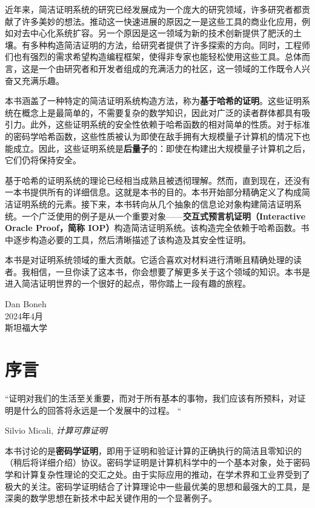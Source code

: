 \documentclass[american,singlepageview]{snargs-book-zh}
\begin{document}
近年来，简洁证明系统的研究已经发展成为一个庞大的研究领域，许多研究者都贡献了许多美妙的想法。推动这一快速进展的原因之一是这些工具的商业化应用，例如对去中心化系统扩容。另一个原因是这一领域为新的技术创新提供了肥沃的土壤。有多种构造简洁证明的方法，给研究者提供了许多探索的方向。同时，工程师们也有强烈的需求希望构造编程框架，使得非专家也能轻松使用这些工具。总体而言，这是一个由研究者和开发者组成的充满活力的社区，这一领域的工作既令人兴奋又充满乐趣。

本书涵盖了一种特定的简洁证明系统构造方法，称为\textbf{基于哈希的证明}。这些证明系统在概念上是最简单的，不需要复杂的数学知识，因此对广泛的读者群体都具有吸引力。此外，这些证明系统的安全性依赖于哈希函数的相对简单的性质。对于标准的密码学哈希函数，这些性质被认为即使在敌手拥有大规模量子计算机的情况下也能成立。因此，这些证明系统是\textbf{后量子}的：即使在构建出大规模量子计算机之后，它们仍将保持安全。

基于哈希的证明系统的理论已经相当成熟且被透彻理解。然而，直到现在，还没有一本书提供所有的详细信息。这就是本书的目的。本书开始部分精确定义了构成简洁证明系统的元素。接下来，本书转向从几个抽象的信息论对象构建简洁证明系统。一个广泛使用的例子是从一个重要对象——\textbf{交互式预言机证明（Interactive Oracle Proof，简称 IOP）}构造简洁证明系统。该构造完全依赖于哈希函数。书中逐步构造必要的工具，然后清晰描述了该构造及其安全性证明。

本书是对证明系统领域的重大贡献。它适合喜欢对材料进行清晰且精确处理的读者。我相信，一旦你读了这本书，你会想要了解更多关于这个领域的知识。本书是进入简洁证明世界的一个很好的起点，带你踏上一段有趣的旅程。


\begin{flushright}
Dan Boneh \\
2024年4月 \\
斯坦福大学
\end{flushright}


\chapter{序言}
\label{section:preface}

\epigraph{``证明对我们的生活至关重要，而对于所有基本的事物，我们应该有所预料，对证明是什么的回答将永远是一个发展中的过程。 ``}{Silvio Micali, \textit{计算可靠证明}}

本书讨论的是\textbf{密码学证明}，即用于证明和验证计算的正确执行的简洁且零知识的（稍后将详细介绍）协议。密码学证明是计算机科学中的一个基本对象，处于密码学和计算复杂性理论的交汇之处。由于实际应用的推动，在学术界和工业界受到了极大的关注。密码学证明结合了计算理论中一些最优美的思想和最强大的工具，是深奥的数学思想在新技术中起关键作用的一个显著例子。
\end{document}
